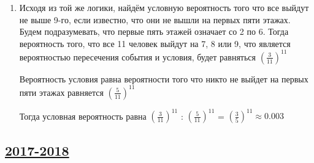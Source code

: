 \begin{enumerate}
\begin{enumerate}
	\item
	Исходя из той же логики, найдём условную вероятность того что все выйдут не выше 9-го, если известно, что они не вышли на первых пяти этажах. Будем подразумевать, что первые пять этажей означает со 2 по 6. Тогда вероятность того, что все 11 человек выйдут на 7, 8 или 9, что является вероятностью пересечения события и условия, будет равняться $ \left(\frac{3}{11}\right)^{11} $
	
	Вероятность условия равна вероятности того что никто не выйдет на первых пяти этажах равняется $ \left(\frac{5}{11}\right)^{11} $
	
	Тогда условная вероятность равна $ \left(\frac{3}{11}\right)^{11} $ : $ \left(\frac{5}{11}\right)^{11} $ = $  \left(\frac{3}{5}\right)^{11} \approx 0.003$
\end{enumerate}



\end{enumerate}	



\subsection[2017-2018]{\hyperref[sec:kr_01_2017_2018]{2017-2018}}
\label{sec:sol_kr_01_2017_2018}

